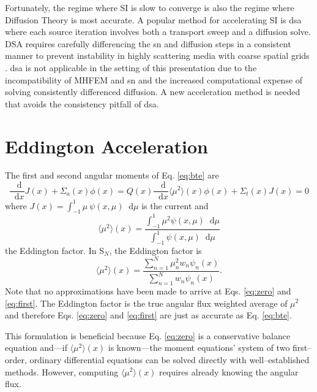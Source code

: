 \documentclass[11 pt]{article}
\newcommand{\SN}{S$_N$\xspace}
\newcommand{\ud}{\mathop{}\!\mathrm{d}} %
\newcommand{\dderiv}[2]{\frac{\ud #1}{\ud #2}}
\newcommand{\edd}{\langle \mu^2 \rangle}
\begin{document}
	Fortunately, the regime where SI is slow to converge is also the regime where Diffusion Theory is most accurate. A popular method for accelerating SI is \gls{dsa} where each source iteration involves both a transport sweep and a diffusion solve. DSA requires carefully differencing the \gls{sn} and diffusion steps in a consistent manner to prevent instability in highly scattering media with coarse spatial grids \cite{alcouffe,morel}. \gls{dsa} is not applicable in the setting of this presentation due to the incompatibility of MHFEM and \gls{sn} and the increased computational expense of solving consistently differenced diffusion. A new acceleration method is needed that avoids the consistency pitfall of \gls{dsa}. 

\section{Eddington Acceleration}
	The first and second angular moments of Eq. \ref{eq:bte} are 
		\begin{subequations} 
		\begin{equation} \label{eq:zero}
			\dderiv{}{x} J(x) + \Sigma_a(x) \phi(x) = Q(x) 
		\end{equation} 
		\begin{equation} \label{eq:first}
			\frac{\ud}{\ud x} \edd(x) \phi(x) + \Sigma_t(x) J(x) = 0  
		\end{equation}
		\end{subequations}
	where $J(x) = \int_{-1}^{1} \mu \ \psi(x, \mu) \ud \mu$ is the current and 
		\begin{equation} \label{eq:eddington} 
			\edd(x) = \frac{\int_{-1}^1 \mu^2 \psi(x, \mu) \ud \mu}{\int_{-1}^1 \psi(x, \mu) \ud \mu}
		\end{equation}
	the Eddington factor. In \SN, the Eddington factor is 
		\begin{equation} \label{eq:edd_sn}
			\edd(x) = \frac{\sum_{n=1}^N \mu_n^2 w_n\psi_n(x)}{\sum_{n=1}^N w_n \psi_n(x)}.
		\end{equation}
	Note that no approximations have been made to arrive at Eqs. \ref{eq:zero} and \ref{eq:first}. The Eddington factor is the true angular flux weighted average of $\mu^2$ and therefore Eqs. \ref{eq:zero} and \ref{eq:first} are just as accurate as Eq. \ref{eq:bte}. 

	This formulation is beneficial because Eq. \ref{eq:zero} is a conservative balance equation and---if $\edd(x)$ is known---the moment equations' system of two first--order, ordinary differential equations can be solved directly with well--established methods. However, computing $\edd(x)$ requires already knowing the angular flux. 
\end{document}
